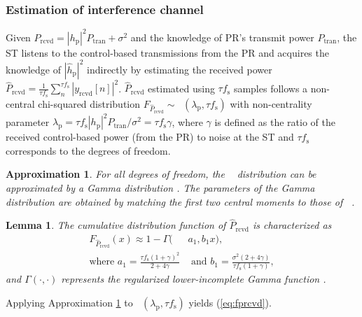 \documentclass[12pt, draftclsnofoot, onecolumn]{IEEEtran}
\newcommand{\s}[2]{{\frac{1}{{#1}}\sum_n^{#1}} {#2}}
\newcommand{\sub}[1]{_{\text{#1}}}
\newcommand{\prcvd}{P\sub{rcvd}}
\newcommand{\eprcvd}{\hat{P}\sub{rcvd}}
\newcommand{\yrcvd}{y\sub{rcvd}}
\newcommand{\ptran}{P\sub{tran}}
\newcommand{\epgp}{|\hat{h}\sub{p}|^2}
\newcommand{\pgp}{|h\sub{p}|^2}
\newcommand{\nps}{\sigma^2}
\newcommand{\fsam}{f\sub{s}}
\newcommand{\fprcvd}{F_{\eprcvd}}
\newcommand{\lp}{\lambda\sub{p}}
\DeclareMathOperator*{\ncchi}{\mathcal{X}_1^2}
\newtheorem{lemma}{Lemma}
\newtheorem{approxi}{Approximation}
\begin{document}
\subsubsection{Estimation of interference channel}
Given $\prcvd = \pgp \ptran + \nps$ and the knowledge of PR's transmit power $\ptran$, the ST listens to the control-based transmissions from the PR and acquires the knowledge of $\epgp$ indirectly by estimating the received power $\eprcvd = \s{\tau \fsam}{ |\yrcvd[n]|^2}$.
$\eprcvd$ estimated using $\tau \fsam$ samples follows a non-central chi-squared distribution $\fprcvd \sim \ncchi(\lp, \tau \fsam)$ with non-centrality parameter $\lp = \tau \fsam \pgp \ptran /\nps = \tau \fsam \gamma$, where $\gamma$ is defined as the ratio of the received control-based power (from the PR) to noise at the ST and $\tau \fsam$ corresponds to the degrees of freedom.
\begin{approxi} \label{ap:ap1}
For all degrees of freedom, the $\ncchi$ distribution can be approximated by a Gamma distribution \cite{abramo}. The parameters of the Gamma distribution are obtained by matching the first two central moments to those of $\ncchi$.
\end{approxi}
\begin{lemma} \label{lm:lm1}
The cumulative distribution function of $\eprcvd$ is characterized as 
\begin{align}
\fprcvd(x) \approx 1 - \Gamma(&a_1, b_1 x) \label{eq:fprcvd}, \\ 
\text{where  } a_1 = \frac{\tau \fsam (1 + \gamma)^2}{2 + 4 \gamma} &\text{ and } b_1 = \frac{\nps (2 + 4 \gamma)}{\tau \fsam (1 + \gamma)},  \nonumber 
\end{align} 
and $\Gamma(\cdot, \cdot)$ represents the regularized lower-incomplete Gamma function \cite{abramo}. 
\end{lemma}
\begin{IEEEproof}
Applying Approximation \ref{ap:ap1} to $\ncchi(\lp, \tau \fsam)$ yields (\ref{eq:fprcvd}). 
\end{IEEEproof}
\end{document}
